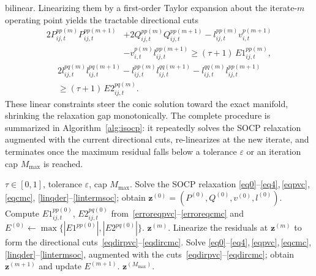 bilinear. Linearizing them by a first-order Taylor expansion about the
iterate-$m$ operating point yields the tractable directional cuts
\begin{equation}\label{eqdirpvc}
\begin{split}
2P_{ij,t}^{pp(m)} P_{ij,t}^{pp(m+1)}
&+ 2Q_{ij,t}^{pp(m)} Q_{ij,t}^{pp(m+1)}
- l_{ij,t}^{pp(m)} v_{i,t}^{p(m+1)} \\&
- v_{i,t}^{p(m)} l_{ij,t}^{pp(m+1)}
\geq (\tau + 1)\, E1_{ij,t}^{pp(m)},
\end{split}
\end{equation}
\begin{equation}\label{eqdircmc}
\begin{split}
2l_{ij,t}^{pq(m)}  l_{ij,t}^{pq(m+1)}
- l_{ij,t}^{pp(m)}  l_{ij,t}^{qq(m+1)}
- l_{ij,t}^{qq(m)}  l_{ij,t}^{pp(m+1)} \\
\geq (\tau + 1)\, E2_{ij,t}^{pq(m)}.
\end{split}
\end{equation}
These linear constraints steer the conic solution toward the exact
manifold, shrinking the relaxation gap monotonically. The complete
procedure is summarized in Algorithm~\ref{alg:isocp}: it repeatedly
solves the SOCP relaxation augmented with the current directional cuts,
re-linearizes at the new iterate, and terminates once the maximum
residual falls below a tolerance $\varepsilon$ or an iteration cap
$M_{\max}$ is reached.

\begin{algorithm}[t]
\caption{Multi-Period Iterative SOCP (MPISOCP).}
\label{alg:isocp}
\begin{algorithmic}[1]
\Require $\tau\!\in\![0,1]$, tolerance $\varepsilon$, cap $M_{\max}$.
\State Solve the SOCP relaxation
\eqref{eq0}--\eqref{eq4},\,\eqref{eqpvc},\,\eqref{eqcmc}, \eqref{linqder}--\eqref{lintermsoc}; obtain
$\bm{z}^{(0)}\!=\!(P^{(0)},Q^{(0)},v^{(0)},l^{(0)})$.
\State Compute $E1^{pp(0)}_{ij,t}$, $E2^{pq(0)}_{ij,t}$
from~\eqref{erroreqpvc}--\eqref{erroreqcmc} and
$E^{(0)}\!\leftarrow\!\max\{|E1^{pp(0)}|,|E2^{pq(0)}|\}$.
     \Return $\bm{z}^{(m)}$. \EndIf
        \State Linearize the residuals at $\bm{z}^{(m)}$ to form the
directional cuts~\eqref{eqdirpvc}--\eqref{eqdircmc}.
\State Solve \eqref{eq0}--\eqref{eq4},\,\eqref{eqpvc},\,\eqref{eqcmc},\eqref{linqder}--\eqref{lintermsoc}, augmented with the cuts~\eqref{eqdirpvc}--\eqref{eqdircmc}; obtain
$\bm{z}^{(m+1)}$ and update $E^{(m+1)}$.
\EndFor
\State \Return $\bm{z}^{(M_{\max})}$.
\end{algorithmic}
\end{algorithm}

